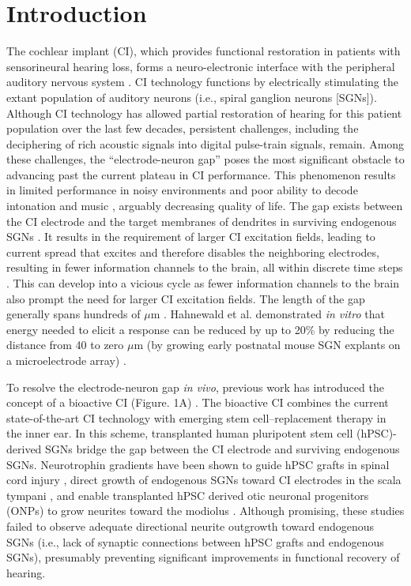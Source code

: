 \documentclass[review]{elsarticle}
\begin{document}
\section{Introduction}
\indent The cochlear implant (CI), which provides functional restoration in patients with sensorineural hearing loss, forms a neuro-electronic interface with the peripheral auditory nervous system \cite{Naples2020a}. CI technology functions by electrically stimulating the extant population of auditory neurons (i.e., spiral ganglion neurons [SGNs]). Although CI technology has allowed partial restoration of hearing for this patient population over the last few decades, persistent challenges, including the deciphering of rich acoustic signals into digital pulse-train signals, remain. Among these challenges, the “electrode-neuron gap” poses the most significant obstacle to advancing past the current plateau in CI performance. This phenomenon results in limited performance in noisy environments and poor ability to decode intonation and music \cite{Wilson2008a}, arguably decreasing quality of life. The gap exists between the CI electrode and the target membranes of dendrites in surviving endogenous SGNs \cite{Frick2017}. It results in the requirement of larger CI excitation fields, leading to current spread that excites and therefore disables the neighboring electrodes, resulting in fewer information channels to the brain, all within discrete time steps \cite{Wilson2008a, Hahnewald2016}. This can develop into a vicious cycle as fewer information channels to the brain also prompt the need for larger CI excitation fields. The length of the gap generally spans hundreds of $\mu$m \cite{Shepherd1993, Tykocinski2000}. Hahnewald et al. demonstrated \textit{in vitro} that energy needed to elicit a response can be reduced by up to 20\% by reducing the distance from 40 to zero $\mu$m (by growing early postnatal mouse SGN explants on a microelectrode array) \cite{Hahnewald2016}.

\indent To resolve the electrode-neuron gap \textit{in vivo}, previous work has introduced the concept of a bioactive CI (Figure. 1A) \cite{Roemer2016a, Heuer2021, Chang2020}. The bioactive CI combines the current state-of-the-art CI technology with emerging stem cell–replacement therapy in the inner ear. In this scheme, transplanted human pluripotent stem cell (hPSC)-derived SGNs bridge the gap between the CI electrode and surviving endogenous SGNs. Neurotrophin gradients have been shown to guide hPSC grafts in spinal cord injury \cite{Taylor2006}, direct growth of endogenous SGNs toward CI electrodes in the scala tympani \cite{Senn2017}, and enable transplanted hPSC derived otic neuronal progenitors (ONPs) to grow neurites toward the modiolus \cite{Chang2020}. Although promising, these studies failed to observe adequate directional neurite outgrowth toward endogenous SGNs (i.e., lack of synaptic connections between hPSC grafts and endogenous SGNs), presumably preventing significant improvements in functional recovery of hearing.
\end{document}
